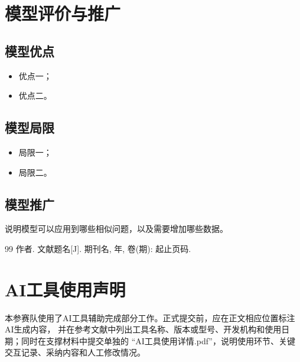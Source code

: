 \documentclass[UTF8,a4paper,12pt,fontset=fandol]{ctexart}
\begin{document}
\section{模型评价与推广}
\subsection{模型优点}
\begin{itemize}
  \item 优点一；
  \item 优点二。
\end{itemize}

\subsection{模型局限}
\begin{itemize}
  \item 局限一；
  \item 局限二。
\end{itemize}

\subsection{模型推广}
说明模型可以应用到哪些相似问题，以及需要增加哪些数据。

\begin{thebibliography}{99}
   作者. 文献题名[J]. 期刊名, 年, 卷(期): 起止页码.
\end{thebibliography}

\section*{AI工具使用声明}
本参赛队使用了AI工具辅助完成部分工作。正式提交前，应在正文相应位置标注AI生成内容，
并在参考文献中列出工具名称、版本或型号、开发机构和使用日期；同时在支撑材料中提交单独的
“AI工具使用详情.pdf”，说明使用环节、关键交互记录、采纳内容和人工修改情况。
\end{document}

